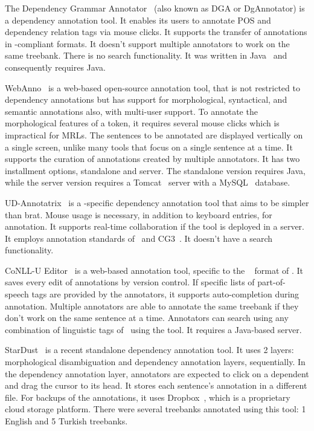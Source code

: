 The Dependency Grammar Annotator~\cite{dgannotator} (also known as DGA or DgAnnotator) is a dependency annotation tool.
It enables its users to annotate POS and dependency relation tags via mouse clicks.
It supports the transfer of annotations in \ud-compliant formats.
It doesn't support multiple annotators to work on the same treebank.
There is no search functionality.
It was written in Java~\cite{java} and consequently requires Java.

WebAnno~\cite{webanno} is a web-based open-source annotation tool, that is not restricted to dependency annotations but has support for morphological, syntactical, and semantic annotations also, with multi-user support.
To annotate the morphological features of a token, it requires several mouse clicks which is impractical for MRLs.
The sentences to be annotated are displayed vertically on a single screen, unlike many tools that focus on a single sentence at a time.
It supports the curation of annotations created by multiple annotators.
It has two installment options, standalone and server.
The standalone version requires Java, while the server version requires a Tomcat~\cite{tomcat} server with a MySQL~\cite{mysql} database.

UD-Annotatrix~\cite{ud-annotatrix} is a \ud-specific dependency annotation tool that aims to be simpler than brat.
Mouse usage is necessary, in addition to keyboard entries, for annotation.
It supports real-time collaboration if the tool is deployed in a server.
It employs annotation standards of \ud\ and CG3~\cite{cg3}.
It doesn't have a search functionality.

CoNLL-U Editor~\cite{conll-u_editor} is a web-based annotation tool, specific to the \conllu~\cite{conll} format of \ud.
It saves every edit of annotations by version control.
If specific lists of part-of-speech tags are provided by the annotators, it supports auto-completion during annotation.
Multiple annotators are able to annotate the same treebank if they don't work on the same sentence at a time.
Annotators can search using any combination of linguistic tags of \ud\ using the tool.
It requires a Java-based server.

StarDust~\cite{stardust} is a recent standalone dependency annotation tool.
It uses 2 layers: morphological disambiguation and dependency annotation layers, sequentially.
In the dependency annotation layer, annotators are expected to click on a dependent and drag the cursor to its head.
It stores each sentence's annotation in a different file.
For backups of the annotations, it uses Dropbox~\cite{dropbox}, which is a proprietary cloud storage platform.
There were several treebanks annotated using this tool: 1 English and 5 Turkish treebanks.

